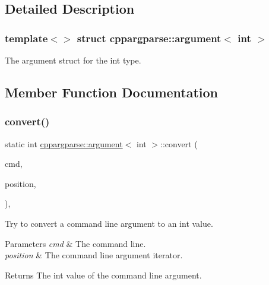 \subsection{Detailed Description}
\subsubsection*{template$<$$>$\newline
struct cppargparse\+::argument$<$ int $>$}

The argument struct for the int type. 

\subsection{Member Function Documentation}
\mbox{\label{structcppargparse_1_1argument_3_01int_01_4_ada0c76b27ff8ca62c811a528a4e310dc}} 
\subsubsection{\texorpdfstring{convert()}{convert()}}
{\footnotesize\ttfamily static int \hyperlink{structcppargparse_1_1argument}{cppargparse\+::argument}$<$ int $>$\+::convert (\begin{DoxyParamCaption}\item[{const \hyperlink{types_8h_a80adf2418b7ce9fe616698efa7533ecf}{types\+::\+Command\+Line\+\_\+t} \&}]{cmd,  }\item[{const \hyperlink{types_8h_a43b4f43f8940de1bf09ced6f1b668053}{types\+::\+Command\+Line\+Position\+\_\+t} \&}]{position,  }\item[{const \hyperlink{types_8h_a003c660afe2ee9c6cc39aea966e8926d}{types\+::\+Command\+Line\+Arguments\+\_\+t} \&}]{ }\end{DoxyParamCaption})\hspace{0.3cm}{\ttfamily [inline]}, {\ttfamily [static]}}



Try to convert a command line argument to an int value. 


\begin{DoxyParams}{Parameters}
{\em cmd} & The command line. \\
\hline
{\em position} & The command line argument iterator.\\
\hline
\end{DoxyParams}
\begin{DoxyReturn}{Returns}
The int value of the command line argument. 
\end{DoxyReturn}
\mbox{\label{structcppargparse_1_1argument_3_01int_01_4_a4b6383c72b1700ecd4718adba1325b0f}} 
